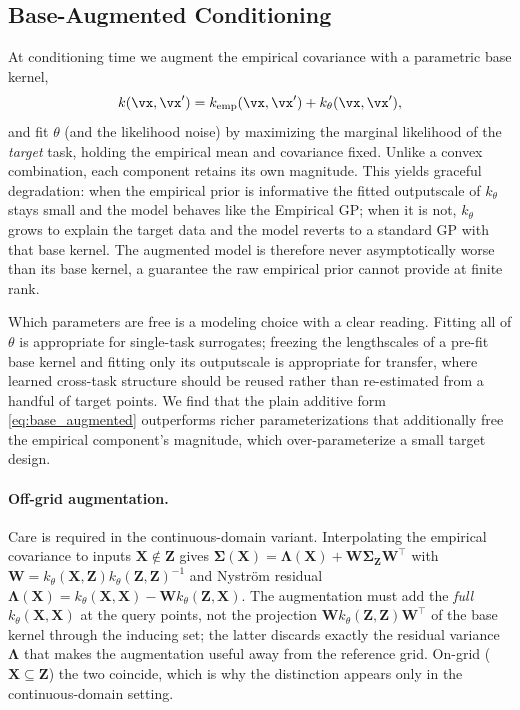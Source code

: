 \subsection{Base-Augmented Conditioning}
\label{apd:base_augmented}

At conditioning time we augment the empirical covariance with a parametric base
kernel,
\begin{equation}
\label{eq:base_augmented}
    k(\vx,\vx') = k_{\text{emp}}(\vx,\vx') + k_{\theta}(\vx,\vx'),
\end{equation}
and fit $\theta$ (and the likelihood noise) by maximizing the marginal likelihood
of the \emph{target} task, holding the empirical mean and covariance fixed.
Unlike a convex combination, each component retains its own magnitude. This
yields graceful degradation: when the empirical prior is informative the fitted
outputscale of $k_\theta$ stays small and the model behaves like the Empirical
GP; when it is not, $k_\theta$ grows to explain the target data and the model
reverts to a standard GP with that base kernel. The augmented model is therefore
never asymptotically worse than its base kernel, a guarantee the raw empirical
prior cannot provide at finite rank.

Which parameters are free is a modeling choice with a clear reading. Fitting all
of $\theta$ is appropriate for single-task surrogates; freezing the lengthscales
of a pre-fit base kernel and fitting only its outputscale is appropriate for
transfer, where learned cross-task structure should be reused rather than
re-estimated from a handful of target points. We find that the plain additive
form \eqref{eq:base_augmented} outperforms richer parameterizations that
additionally free the empirical component's magnitude, which over-parameterize a
small target design.

\paragraph{Off-grid augmentation.}
Care is required in the continuous-domain variant. Interpolating the empirical
covariance to inputs $\mathbf{X}\notin\mathbf{Z}$ gives
$\boldsymbol{\Sigma}(\mathbf{X}) = \boldsymbol{\Lambda}(\mathbf{X}) + \mathbf{W}\boldsymbol{\Sigma}_{\mathbf{Z}}\mathbf{W}^\top$
with $\mathbf{W}=k_\theta(\mathbf{X},\mathbf{Z})k_\theta(\mathbf{Z},\mathbf{Z})^{-1}$
and Nystr\"om residual
$\boldsymbol{\Lambda}(\mathbf{X}) = k_\theta(\mathbf{X},\mathbf{X}) - \mathbf{W}k_\theta(\mathbf{Z},\mathbf{X})$.
The augmentation must add the \emph{full} $k_\theta(\mathbf{X},\mathbf{X})$ at the
query points, not the projection
$\mathbf{W}k_\theta(\mathbf{Z},\mathbf{Z})\mathbf{W}^\top$ of the base kernel
through the inducing set; the latter discards exactly the residual variance
$\boldsymbol{\Lambda}$ that makes the augmentation useful away from the reference
grid. On-grid ($\mathbf{X}\subseteq\mathbf{Z}$) the two coincide, which is why the
distinction appears only in the continuous-domain setting.

